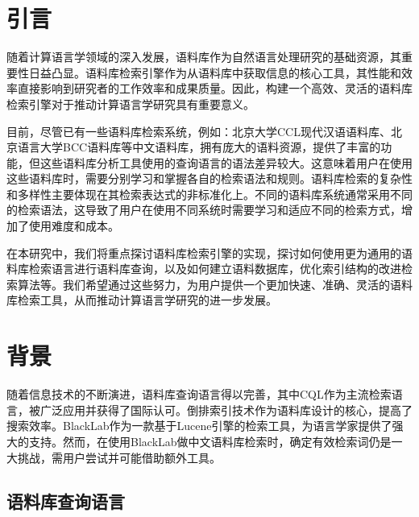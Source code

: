 \documentclass[11pt]{article}
\begin{document}
\begin{CJK*}{UTF8}{gbsn}
\section{引言}
\label{intro}

随着计算语言学领域的深入发展，语料库作为自然语言处理研究的基础资源，其重要性日益凸显。语料库检索引擎作为从语料库中获取信息的核心工具，其性能和效率直接影响到研究者的工作效率和成果质量。因此，构建一个高效、灵活的语料库检索引擎对于推动计算语言学研究具有重要意义。

目前，尽管已有一些语料库检索系统，例如：北京大学CCL现代汉语语料库\cite{ccl}、北京语言大学BCC语料库等中文语料库\cite{bcc}，拥有庞大的语料资源，提供了丰富的功能，但这些语料库分析工具使用的查询语言的语法差异较大\cite{zhangyongwei}。这意味着用户在使用这些语料库时，需要分别学习和掌握各自的检索语法和规则。语料库检索的复杂性和多样性主要体现在其检索表达式的非标准化上。不同的语料库系统通常采用不同的检索语法，这导致了用户在使用不同系统时需要学习和适应不同的检索方式，增加了使用难度和成本。


在本研究中，我们将重点探讨语料库检索引擎的实现，探讨如何使用更为通用的语料库检索语言进行语料库查询，以及如何建立语料数据库，优化索引结构的改进检索算法等。我们希望通过这些努力，为用户提供一个更加快速、准确、灵活的语料库检索工具，从而推动计算语言学研究的进一步发展。

%
%

\section{背景}
\label{backgound}

随着信息技术的不断演进，语料库查询语言得以完善，其中CQL作为主流检索语言，被广泛应用并获得了国际认可。倒排索引技术作为语料库设计的核心，提高了搜索效率。BlackLab作为一款基于Lucene引擎的检索工具，为语言学家提供了强大的支持。然而，在使用BlackLab做中文语料库检索时，确定有效检索词仍是一大挑战，需用户尝试并可能借助额外工具。


\subsection{语料库查询语言}


\end{CJK*}
\end{document}
